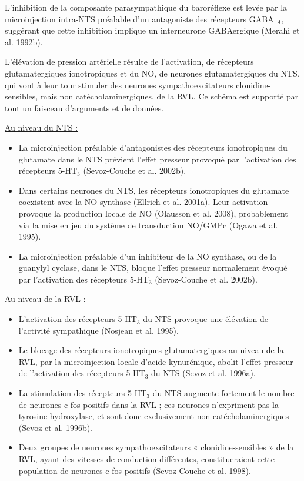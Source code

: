 \documentclass[a4paper,12pt,twoside]{report}
\begin{document}
L’inhibition de la composante parasympathique du baroréflexe est levée par la microinjection intra-NTS préalable d’un antagoniste des récepteurs GABA $_{A}$, suggérant que cette inhibition implique un interneurone GABAergique (Merahi et al. 1992b).

L’élévation de pression artérielle résulte de l’activation, de récepteurs glutamatergiques ionotropiques et du NO, de neurones glutamatergiques du NTS, qui vont à leur tour stimuler des neurones sympathoexcitateurs clonidine-sensibles, mais non catécholaminergiques, de la RVL. Ce schéma est supporté par tout un faisceau d’arguments et de données. 

\underline{Au niveau du NTS :}

\begin{itemize}
\item La microinjection préalable d’antagonistes des récepteurs ionotropiques du glutamate dans le NTS prévient l’effet presseur provoqué par l’activation des récepteurs 5-HT$_{3}$ (Sevoz-Couche et al. 2002b).
\item Dans certains neurones du NTS, les récepteurs ionotropiques du glutamate coexistent avec la NO synthase (Ellrich et al. 2001a). Leur activation provoque la production locale de NO (Olausson et al. 2008), probablement via la mise en jeu du système de transduction NO/GMPc (Ogawa et al. 1995).
\item La microinjection préalable d’un inhibiteur de la NO synthase, ou de la guanylyl cyclase, dans le NTS, bloque l’effet presseur normalement évoqué par l’activation des récepteurs 5-HT$_{3}$ (Sevoz-Couche et al. 2002b).
\end{itemize}

\underline{Au niveau de la RVL :}

\begin{itemize}
\item L’activation des récepteurs 5-HT$_{3}$ du NTS provoque une élévation de l'activité sympathique (Nosjean et al. 1995). 
\item Le blocage des récepteurs ionotropiques glutamatergiques au niveau de la RVL, par la microinjection locale d'acide kynurénique, abolit l'effet presseur de l’activation des récepteurs 5-HT$_{3}$ du NTS (Sevoz et al. 1996a). 
\item La stimulation des récepteurs 5-HT$_{3}$ du NTS augmente fortement le nombre de neurones c-fos positifs dans la RVL ; ces neurones n’expriment pas la tyrosine hydroxylase, et sont donc exclusivement non-catécholaminergiques (Sevoz et al. 1996b). 
\item Deux groupes de neurones sympathoexcitateurs « clonidine-sensibles » de la RVL, ayant des vitesses de conduction différentes, constitueraient cette population de neurones c-fos positifs (Sevoz-Couche et al. 1998).
\end{itemize}
 
\end{document}
